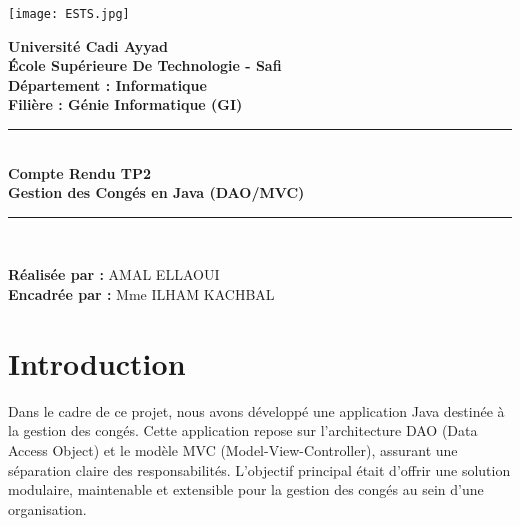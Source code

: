 \documentclass[a4paper,12pt]{article}
\begin{document}
\begin{titlepage}
    \begin{flushleft}
        \texttt{[image: ESTS.jpg]} %
    \end{flushleft}
    \begin{center}
        {\large \textbf{\color{myblue}Université Cadi Ayyad}} \\[0.2cm]
        {\large \textbf{\color{myblue}École Supérieure De Technologie - Safi}} \\[0.2cm]
        {\large \textbf{\color{myblue}Département : Informatique}} \\[0.2cm]
        {\large \textbf{\color{myblue}Filière : Génie Informatique (GI)}} \\[0.8cm]
        \rule{\linewidth}{0.5mm} \\[0.4cm] %
        {\Huge \textbf{\color{myred}Compte Rendu TP2}} \\[0.5cm]
        {\Large \textbf{\color{myred}Gestion des Congés en Java (DAO/MVC)}} \\[1.5cm]
        
        \rule{\linewidth}{0.5mm} \\[2cm] %
    \end{center}


    \vfill %
    \begin{flushleft}
        \textbf{Réalisée par :} AMAL ELLAOUI \\[0.3cm]
        \textbf{Encadrée par :} Mme ILHAM KACHBAL
    \end{flushleft}
    \end{titlepage}
\tableofcontents
\newpage
\section{Introduction}

Dans le cadre de ce projet, nous avons développé une application Java destinée à la gestion des congés. Cette application repose sur l'architecture DAO (Data Access Object) et le modèle MVC (Model-View-Controller), assurant une séparation claire des responsabilités. L'objectif principal était d'offrir une solution modulaire, maintenable et extensible pour la gestion des congés au sein d'une organisation.
\end{document}
